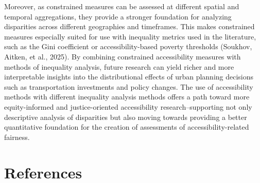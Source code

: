 \documentclass[
11pt, %
oneside, %
english, %
singlespacing, %
]{macthesis} %
\begin{document}
Moreover, as constrained measures can be assessed at different spatial and temporal aggregations, they provide a stronger foundation for analyzing disparities across different geographies and timeframes. This makes constrained measures especially suited for use with inequality metrics used in the literature, such as the Gini coefficient or accessibility-based poverty thresholds (Soukhov, Aitken, et al., 2025). By combining constrained accessibility measures with methods of inequality analysis, future research can yield richer and more interpretable insights into the distributional effects of urban planning decisions such as transportation investments and policy changes. The use of accessibility methods with different inequality analysis methods offers a path toward more equity-informed and justice-oriented accessibility research--supporting not only descriptive analysis of disparities but also moving towards providing a better quantitative foundation for the creation of assessments of accessibility-related fairness.

\backmatter

\chapter*{References}\label{references}


\noindent

\setlength{\parindent}{-0.20in}
\setlength{\leftskip}{0.20in}
\setlength{\parskip}{8pt}
\end{document}
